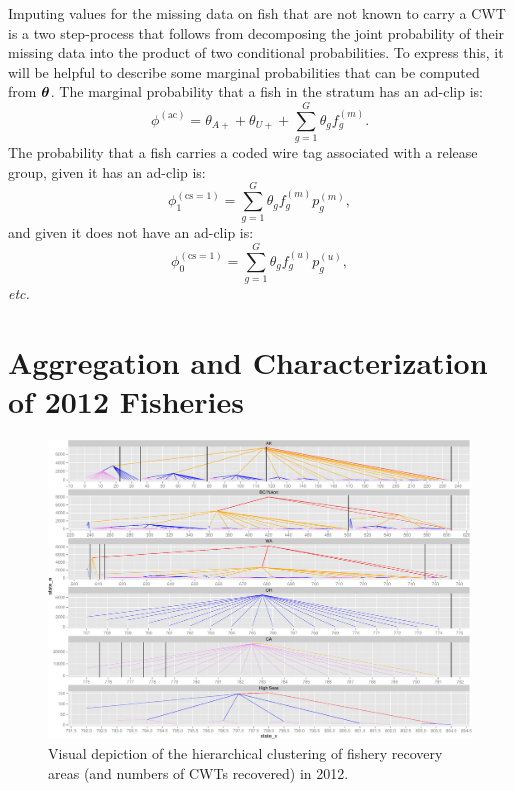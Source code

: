 \documentclass[11pt]{article}
\makeatletter
\def\bm#1{\mathpalette\bmstyle{#1}}
\def\bmstyle#1#2{\mbox{\boldmath$#1#2$}}
\newcommand{\etc}{{\em etc.}\@\xspace}
\newcommand{\btheta}{\bm{\theta}}
\makeatother
\begin{document}
Imputing values for the missing data on fish that are not known to carry a CWT is a two step-process that follows
from decomposing the joint probability of their missing data into the product of two conditional probabilities.
To express this, it will be helpful to describe some marginal probabilities that can be computed from $\btheta$.  The marginal probability that a fish in the stratum has an ad-clip is:
\[
\phi^{(\mathrm{ac})} = \theta_{A+} + \theta_{U+} + \sum_{g=1}^G \theta_g f^{(m)}_g.
\]
The probability that a fish carries a coded wire tag associated with a release group, given it has an ad-clip is:
\[
\phi^{(\mathrm{cs}=1)}_1 =  \sum_{g=1}^G \theta_g f^{(m)}_g p^{(m)}_g,
\]
and given it does not have an ad-clip is:
\[
\phi^{(\mathrm{cs}=1)}_0 =  \sum_{g=1}^G \theta_g f^{(u)}_g p^{(u)}_g,
\]
\etc


\section{Aggregation and Characterization of 2012 Fisheries \label{sec:agg}}

\begin{figure}
\begin{center}
\includegraphics[width=\textwidth]{images/recovery_trees_divided.pdf}
\end{center}
\caption{Visual depiction of the hierarchical clustering of fishery recovery areas (and numbers of CWTs recovered)
in 2012.}
\end{figure}
\end{document}
